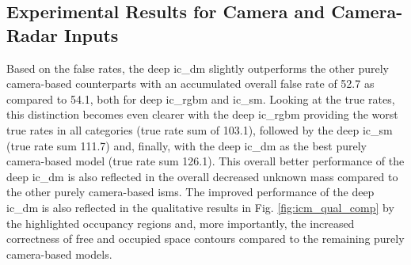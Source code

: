 \subsection{Experimental Results for Camera and Camera-Radar Inputs}
\label{subsec:exp_cam_fusion_in_deep_isms}
Based on the false rates, the deep \gls{ic_dm} slightly outperforms the other purely camera-based counterparts with an accumulated overall false rate of 52.7 as compared to 54.1, both for deep \gls{ic_rgbm} and \gls{ic_sm}. Looking at the true rates, this distinction becomes even clearer with the deep \gls{ic_rgbm} providing the worst true rates in all categories (true rate sum of 103.1), followed by the deep \gls{ic_sm} (true rate sum 111.7) and, finally, with the deep \gls{ic_dm} as the best purely camera-based model (true rate sum 126.1). This overall better performance of the deep \gls{ic_dm} is also reflected in the overall decreased unknown mass compared to the other purely camera-based \gls{ism}s. The improved performance of the deep \gls{ic_dm} is also reflected in the qualitative results in Fig. \ref{fig:icm_qual_comp} by the highlighted occupancy regions and, more importantly, the increased correctness of free and occupied space contours compared to the remaining purely camera-based models.
